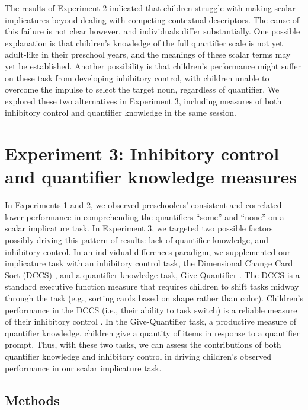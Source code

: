 \documentclass[man]{apa2}
\begin{document}
The results of Experiment 2 indicated that children struggle with making scalar implicatures beyond dealing with competing contextual descriptors. The cause of this failure is not clear however, and individuals differ substantially. One possible explanation is that children's knowledge of the full quantifier scale is not yet adult-like in their preschool years, and the meanings of these scalar terms may yet be established. Another possibility is that children's performance might suffer on these task from developing inhibitory control, with children unable to overcome the impulse to select the target noun, regardless of quantifier. We explored these two alternatives in Experiment 3, including measures of both inhibitory control and quantifier knowledge in the same session. 

				
\section{Experiment 3: Inhibitory control and quantifier knowledge measures}

In Experiments 1 and 2, we observed preschoolers' consistent and correlated lower performance in comprehending the quantifiers ``some'' and ``none'' on a scalar implicature task. In Experiment 3, we targeted two possible factors possibly driving this pattern of results: lack of quantifier knowledge, and inhibitory control. In an individual differences paradigm, we supplemented our implicature task with an inhibitory control task, the Dimensional Change Card Sort (DCCS) \cite{zelazo2006}, and a quantifier-knowledge task, Give-Quantifier \cite{barner2009}. The DCCS is a standard executive function measure that requires children to shift tasks midway through the task (e.g., sorting cards based on shape rather than color). Children's performance in the DCCS (i.e., their ability to task switch) is a reliable measure of their inhibitory control \cite{zelazo2006}. In the Give-Quantifier task, a productive measure of quantifier knowledge, children give a quantity of items in response to a quantifier prompt. Thus, with these two tasks, we can assess the contributions of both quantifier knowledge and inhibitory control in driving children's observed performance in our scalar implicature task.

\subsection{Methods}
\end{document}
